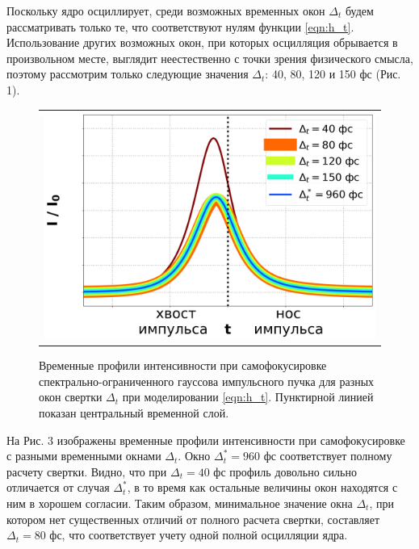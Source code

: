 \documentclass[a4paper]{article}
\begin{document}
Поскольку ядро осциллирует, среди возможных временных окон $\Delta_t$ будем рассматривать только те, что соответствуют нулям функции \eqref{eqn:h_t}. Использование других возможных окон, при которых осцилляция обрывается в произвольном месте, выглядит неестественно с точки зрения физического смысла, поэтому рассмотрим только следующие значения $\Delta_t$: 40, 80, 120 и 150 фс (Рис. 1). 
\begin{figure}[h]
\begin{center}
\begin{tabular}{M{10cm}}
\includegraphics[width=\linewidth]{images/kerr_inertial_w.png}
\end{tabular}
\begin{minipage}{0.7\textwidth}
\caption{Временные профили интенсивности при самофокусировке спектрально-ограниченного гауссова импульсного пучка для разных окон свертки $\Delta_t$ при моделировании \eqref{eqn:h_t}. Пунктирной линией показан центральный временной слой.}
\end{minipage}
\label{pic:kerr_inertial_w}
\end{center}
\end{figure}
На Рис. 3 изображены временные профили интенсивности при самофокусировке с разными временными окнами $\Delta_t$. Окно $\Delta_t^* = 960$ фс соответствует полному расчету свертки. Видно, что при $\Delta_t = 40$ фс профиль довольно сильно отличается от случая $\Delta_t^*$, в то время как остальные величины окон находятся с ним в хорошем согласии. Таким образом, минимальное значение окна $\Delta_t$, при котором нет существенных отличий от полного расчета свертки, составляет $\Delta_t = 80$ фс, что соответствует учету одной полной осцилляции ядра. 
\end{document}
